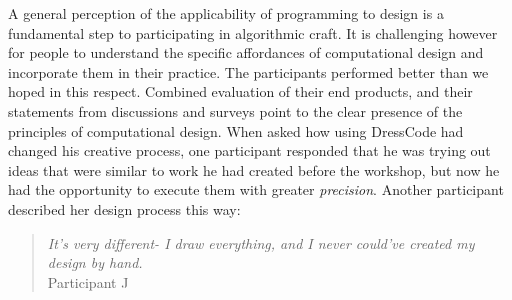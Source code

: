 \documentclass{sigchi}
\begin{document}
A general perception of the applicability of programming to design is a fundamental step to participating in algorithmic craft. It is challenging however for people to understand the specific affordances of computational design and incorporate them in their practice. The participants performed better than we hoped in this respect. Combined evaluation of their end products, and their statements from discussions and surveys point to the clear presence of the principles of computational design. When asked how using DressCode had changed his creative process, one participant responded that he was trying out ideas that were similar to work he had created before the workshop, but now he had the opportunity to execute them with greater \textit{precision}. Another participant described her design process this way:
\begin{quotation}
	\textit{It's very different- I draw everything, and I never could've created my design by hand.}
	\\Participant J
\end{quotation}
\end{document}
